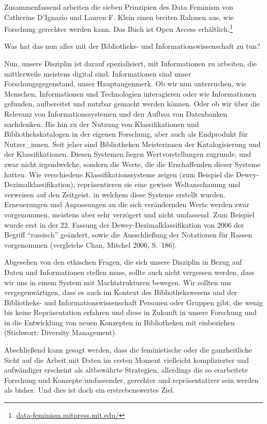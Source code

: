 \documentclass[a4paper,
fontsize=11pt,
oneside,
numbers=noperiodatend,
parskip=half-,
bibliography=totoc,
final
]{scrartcl}
\begin{document}
Zusammenfassend arbeiten die sieben Prinzipien des Data Feminism von
Catherine D'Ignazio und Lauren F. Klein einen breiten Rahmen aus, wie
Forschung gerechter werden kann. Das Buch ist Open Access
erhältlich.\footnote{\url{data-feminism.mitpress.mit.edu/}}

Was hat das nun alles mit der Bibliotheks- und Informationswissenschaft
zu tun?

Nun, unsere Disziplin ist darauf spezialisiert, mit Informationen zu
arbeiten, die mittlerweile meistens digital sind. Informationen sind
unser Forschungsgegenstand, unser Hauptaugenmerk. Ob wir nun
untersuchen, wie Menschen, Informationen und Technologien interagieren
oder wie Informationen gefunden, aufbereitet und nutzbar gemacht werden
können. Oder ob wir über die Relevanz von Informationssystemen und den
Aufbau von Datenbanken nachdenken. Bis hin zu der Nutzung von
Klassifikationen und Bibliothekskatalogen in der eigenen Forschung, aber
auch als Endprodukt für Nutzer\_innen. Seit jeher sind Bibliotheken
Meisterinnen der Katalogisierung und der Klassifikationen. Diesen
Systemen liegen Wertvorstellungen zugrunde, und zwar nicht irgendwelche,
sondern die Werte, die die Erschaffenden dieser Systeme hatten. Wie
verschiedene Klassifikationssysteme zeigen (zum Beispiel die
Dewey-Dezimalklassifikation), repräsentieren sie eine gewisse
Weltanschauung und verweisen auf den Zeitgeist, in welchem diese Systeme
erstellt wurden. Erneuerungen und Anpassungen an die sich verändernden
Werte werden zwar vorgenommen, meistens aber sehr verzögert und nicht
umfassend. Zum Beispiel wurde erst in der 22. Fassung der
Dewey-Dezimalklassifikation von 2006 der Begriff \enquote{rassisch}
geändert, sowie die Ausschließung der Notationen für Rassen vorgenommen
(vergleiche Chan, Mitchel 2006, S.~186).

Abgesehen von den ethischen Fragen, die sich unsere Disziplin in Bezug
auf Daten und Informationen stellen muss, sollte auch nicht vergessen
werden, dass wir uns in einem System mit Machtstrukturen bewegen. Wir
sollten uns vergegenwärtigen, dass es auch im Kontext des
Bibliothekswesens und der Bibliotheks- und Informationswissenschaft
Personen oder Gruppen gibt, die wenig bis keine Repräsentation erfahren
und diese in Zukunft in unsere Forschung und in die Entwicklung von
neuen Konzepten in Bibliotheken mit einbeziehen (Stichwort: Diversity
Management).

Abschließend kann gesagt werden, dass die feministische oder die
ganzheitliche Sicht auf die Arbeit mit Daten im ersten Moment vielleicht
komplizierter und aufwändiger erscheint als altbewährte Strategien,
allerdings die so erarbeitete Forschung und Konzepte umfassender,
gerechter und repräsentativer sein werden als bisher. Und dies ist doch
ein erstrebenswertes Ziel.
\end{document}
